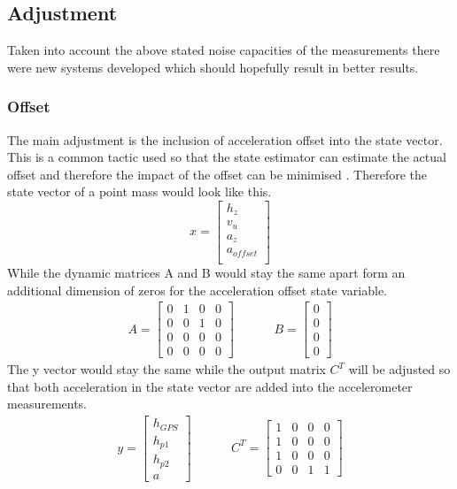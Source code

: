 \subsection{Adjustment}
Taken into account the above stated noise capacities of the measurements there were new systems developed which should hopefully result in better results.
\subsubsection{Offset}
The main adjustment is the inclusion of acceleration offset into the state vector.
This is a common tactic used so that the state estimator can estimate the actual offset and therefore the impact of the offset can be minimised \cite{DavidWSchultz2004}.
Therefore the state vector of a point mass would look like this.
$$ x = \begin{bmatrix}
        h_z \\
        v_u \\
        a_z \\
        a_{offset} \\
       \end{bmatrix}
$$
While the dynamic matrices A and B would stay the same apart form an additional dimension of zeros for the acceleration offset state variable.
\begin{align*}
 A = \begin{bmatrix}
      0 & 1 & 0 & 0 \\
      0 & 0 & 1 & 0 \\
      0 & 0 & 0 & 0 \\
      0 & 0 & 0 & 0
     \end{bmatrix}
     & \hspace{1cm}
 B = \begin{bmatrix}
      0 \\
      0 \\
      0 \\
      0
     \end{bmatrix}
\end{align*}
The y vector would stay the same while the output matrix $C^T$ will be adjusted so that both acceleration in the state vector are added into the accelerometer measurements.
\begin{align*}
 y = \begin{bmatrix}
      h_{GPS} \\
      h_{p1} \\
      h_{p2} \\
      a
     \end{bmatrix}
     & \hspace{1cm}
 C^T = \begin{bmatrix}
      1 & 0 & 0 & 0 \\
      1 & 0 & 0 & 0 \\
      1 & 0 & 0 & 0 \\
      0 & 0 & 1 & 1
     \end{bmatrix}
\end{align*}

